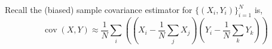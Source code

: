 \documentclass[letterpaper,11pt]{exam}
\DeclareMathOperator*{\cov}{cov}
\begin{document}
\begin{questions}
\begin{parts}
	\begin{tcolorbox}
	    Recall the (biased) sample covariance estimator for $\{(X_i, Y_i)\}_{i=1}^{N}$ is,
	\begin{equation}\label{eq:cov:est}
	\cov(X, Y) \approx \frac{1}{N}\sum_i 
	\left(
	    (X_i - \frac{1}{N}\sum_j X_j)
	    (Y_i - \frac{1}{N}\sum_k Y_k)
	\right)
	\end{equation}
	\end{tcolorbox}
\end{parts}
\end{questions}

\nocite{Simoncelli2004}
\nocite{Park2011c}


\end{document}
